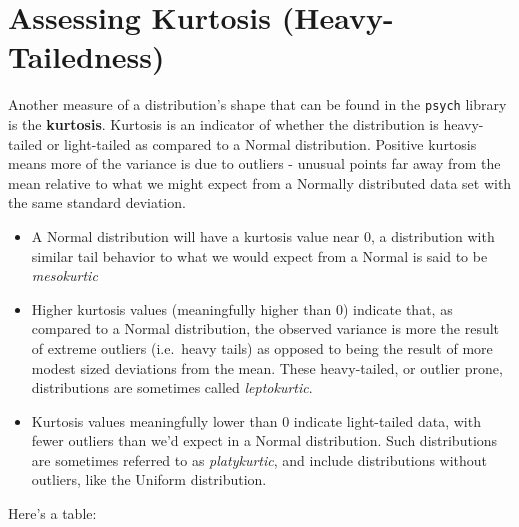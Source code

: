 \documentclass[
]{book}
\providecommand{\tightlist}{%
  \setlength{\itemsep}{0pt}\setlength{\parskip}{0pt}}
\begin{document}
\hypertarget{assessing-kurtosis-heavy-tailedness}{%
\section{Assessing Kurtosis (Heavy-Tailedness)}\label{assessing-kurtosis-heavy-tailedness}}

Another measure of a distribution's shape that can be found in the \texttt{psych} library is the \textbf{kurtosis}. Kurtosis is an indicator of whether the distribution is heavy-tailed or light-tailed as compared to a Normal distribution. Positive kurtosis means more of the variance is due to outliers - unusual points far away from the mean relative to what we might expect from a Normally distributed data set with the same standard deviation.

\begin{itemize}
\tightlist
\item
  A Normal distribution will have a kurtosis value near 0, a distribution with similar tail behavior to what we would expect from a Normal is said to be \emph{mesokurtic}
\item
  Higher kurtosis values (meaningfully higher than 0) indicate that, as compared to a Normal distribution, the observed variance is more the result of extreme outliers (i.e.~heavy tails) as opposed to being the result of more modest sized deviations from the mean. These heavy-tailed, or outlier prone, distributions are sometimes called \emph{leptokurtic}.
\item
  Kurtosis values meaningfully lower than 0 indicate light-tailed data, with fewer outliers than we'd expect in a Normal distribution. Such distributions are sometimes referred to as \emph{platykurtic}, and include distributions without outliers, like the Uniform distribution.
\end{itemize}

Here's a table:
\end{document}
